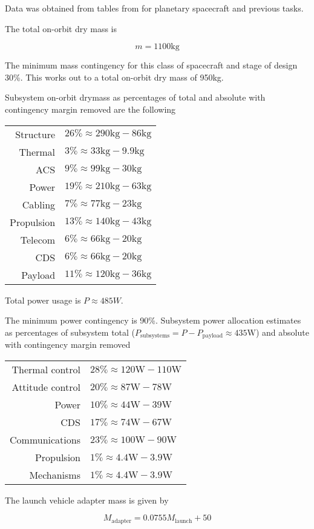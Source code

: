 Data was obtained from tables from
\cite[p. 589,590]{brown2002elements} for planetary spacecraft and
previous tasks.

The total on-orbit dry mass is

\[ m = 1100\mathrm{kg} \]

The minimum mass contingency for this class of spacecraft and stage of
design 30\%. This works out to a total on-orbit dry mass of 950kg.

Subsystem on-orbit drymass as percentages of total and absolute with
contingency margin removed are the following

\begin{center}
\begin{tabular}{rl}
Structure & $26\% \approx 290\mathrm{kg} - 86\mathrm{kg}$ \\
Thermal & $3\% \approx 33\mathrm{kg} - 9.9\mathrm{kg}$ \\
ACS & $9\% \approx 99\mathrm{kg} - 30\mathrm{kg}$ \\
Power & $19\% \approx 210\mathrm{kg} - 63\mathrm{kg}$ \\
Cabling & $7\% \approx 77\mathrm{kg} - 23\mathrm{kg}$ \\
Propulsion & $13\% \approx 140\mathrm{kg} - 43\mathrm{kg}$ \\
Telecom & $6\% \approx 66\mathrm{kg} - 20\mathrm{kg}$ \\
CDS & $6\% \approx 66\mathrm{kg} - 20\mathrm{kg}$ \\
Payload & $11\% \approx 120\mathrm{kg} - 36\mathrm{kg}$ \\
\end{tabular}
\end{center}

Total power usage is $P \approx 485{W}$.

The minimum power contingency is 90\%. Subsystem power allocation
estimates as percentages of subsystem total ($P_\mathrm{subsystems} =
P - P_\mathrm{payload} \approx 435\mathrm{W}$) and absolute with
contingency margin removed

\begin{center}
\begin{tabular}{rl}
Thermal control & $28\% \approx 120\mathrm{W} - 110\mathrm{W}$ \\
Attitude control & $20\% \approx 87\mathrm{W} - 78\mathrm{W}$ \\
Power & $10\% \approx 44\mathrm{W} - 39\mathrm{W}$ \\
CDS & $17\% \approx 74\mathrm{W} - 67\mathrm{W}$ \\
Communications & $23\% \approx 100\mathrm{W} - 90\mathrm{W}$ \\
Propulsion & $1\% \approx 4.4\mathrm{W} - 3.9\mathrm{W}$ \\
Mechanisms & $1\% \approx 4.4\mathrm{W} - 3.9\mathrm{W}$ \\
\end{tabular}
\end{center}

The launch vehicle adapter mass is given by

\begin{equation}
  M_{\mathrm{adapter}} = 0.0755 M_{\mathrm{launch}} + 50
\end{equation}
